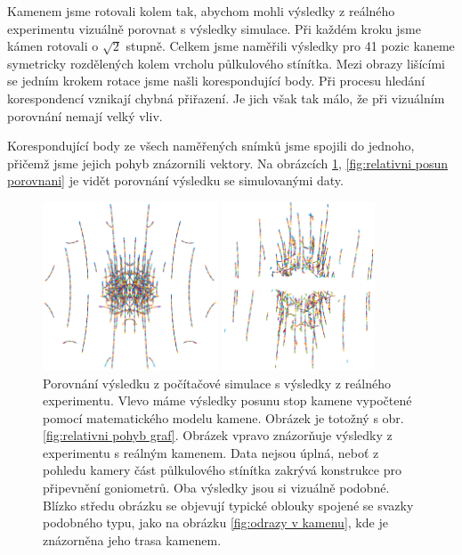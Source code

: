  Kamenem jsme rotovali kolem tak, abychom mohli výsledky z reálného experimentu vizuálně porovnat s výsledky simulace. Při každém kroku jsme kámen rotovali o $\sqrt{2}$ stupně. Celkem jsme naměřili výsledky pro 41 pozic kaneme symetricky rozdělených kolem vrcholu půlkulového stínítka. Mezi obrazy lišícími se jedním krokem rotace jsme našli korespondující body. Při procesu hledání korespondencí vznikají chybná přiřazení. Je jich však tak málo, že při vizuálním porovnání nemají velký vliv. 
 
Korespondující body ze všech naměřených snímků jsme spojili do jednoho, přičemž jsme jejich pohyb znázornili vektory. Na obrázcích \ref{fig:graf posunu porovnani}, \ref{fig:relativni posun porovnani} je vidět porovnání výsledku se simulovanými daty.  

\begin{figure}[h!]
 \begin{center}
 

   \begin{minipage}[c]{0.49\textwidth}
     \centering \includegraphics[height =5cm]{figures/viva12_bigflux} 
   \end{minipage}
   \begin{minipage}[c]{0.49\textwidth}
     \centering \includegraphics[height =5cm]{figures/real_all} 
   \end{minipage}
 \end{center}

   \caption{Porovnání výsledku z počítačové simulace s výsledky z reálného experimentu. Vlevo máme výsledky posunu stop kamene  vypočtené pomocí matematického modelu kamene. Obrázek je totožný s obr. \ref{fig:relativni pohyb graf}. Obrázek vpravo znázorňuje výsledky z experimentu s reálným kamenem. Data nejsou úplná, neboť z pohledu kamery část půlkulového stínítka zakrývá konstrukce pro připevnění goniometrů. Oba výsledky jsou si vizuálně podobné. Blízko středu obrázku se objevují typické oblouky spojené se svazky podobného typu, jako na obrázku \ref{fig:odrazy v kamenu}, kde je znázorněna jeho trasa kamenem.}
   \label{fig:graf posunu porovnani}
 \end{figure}
 
